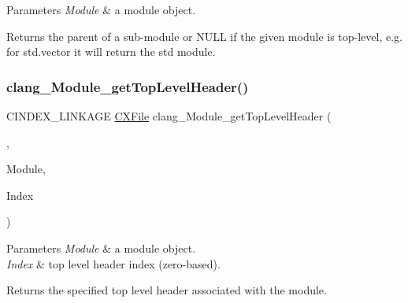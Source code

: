 \begin{DoxyParams}{Parameters}
{\em Module} & a module object.\\
\hline
\end{DoxyParams}
\begin{DoxyReturn}{Returns}
the parent of a sub-\/module or N\+U\+LL if the given module is top-\/level, e.\+g. for \textquotesingle{}std.\+vector\textquotesingle{} it will return the \textquotesingle{}std\textquotesingle{} module. 
\end{DoxyReturn}
\mbox{\label{group__CINDEX__MODULE_ga08aa0746251ca2e8eee69c8fe7c15e2b}} 
\subsubsection{\texorpdfstring{clang\+\_\+\+Module\+\_\+get\+Top\+Level\+Header()}{clang\_Module\_getTopLevelHeader()}}
{\footnotesize\ttfamily C\+I\+N\+D\+E\+X\+\_\+\+L\+I\+N\+K\+A\+GE \mbox{\hyperlink{group__CINDEX__FILES_gacfcea9c1239c916597e2e5b3e109215a}{C\+X\+File}} clang\+\_\+\+Module\+\_\+get\+Top\+Level\+Header (\begin{DoxyParamCaption}\item[{\mbox{\hyperlink{group__CINDEX_gacdb7815736ca709ce9a5e1ec2b7e16ac}{C\+X\+Translation\+Unit}}}]{,  }\item[{C\+X\+Module}]{Module,  }\item[{unsigned}]{Index }\end{DoxyParamCaption})}


\begin{DoxyParams}{Parameters}
{\em Module} & a module object.\\
\hline
{\em Index} & top level header index (zero-\/based).\\
\hline
\end{DoxyParams}
\begin{DoxyReturn}{Returns}
the specified top level header associated with the module. 
\end{DoxyReturn}
\mbox{\label{group__CINDEX__MODULE_ga1e4ad74c404b5f3bcd30cec4dc12fa34}} 
